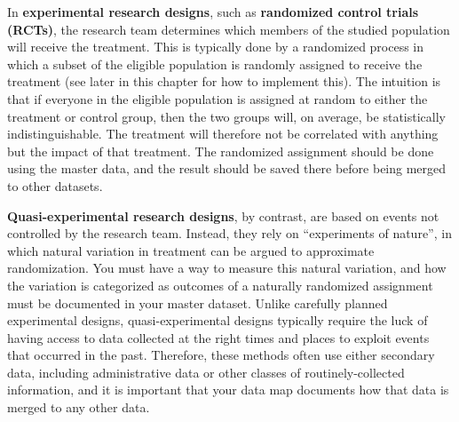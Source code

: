 
In \textbf{experimental research designs}, 
such as \textbf{randomized control trials (RCTs)},
 
the research team determines which members
of the studied population will receive the treatment.
This is typically done by a randomized process
in which a subset of the eligible population
is randomly assigned to receive the treatment
(see later in this chapter for how to implement this).
The intuition is that if everyone in the eligible population
is assigned at random to either the treatment or control group,
then the two groups will, on average, be statistically indistinguishable.
The treatment will therefore not be correlated with anything
but the impact of that treatment.\cite{duflo2007using}
The randomized assignment should be done using the master data,
and the result should be saved there before being merged to other datasets.


\textbf{Quasi-experimental research designs},
by contrast, are based on events not controlled by the research team.
Instead, they rely on ``experiments of nature'',
in which natural variation in treatment can be argued to approximate randomization.
You must have a way to measure this natural variation,
and how the variation is categorized as outcomes of a naturally randomized assignment
must be documented in your master dataset.
Unlike carefully planned experimental designs,
quasi-experimental designs typically require the luck
of having access to data collected at the right times and places
to exploit events that occurred in the past.
Therefore, these methods often use either secondary data,
including administrative data or other classes of routinely-collected information,
and it is important that your data map documents 
how that data is merged to any other data.



